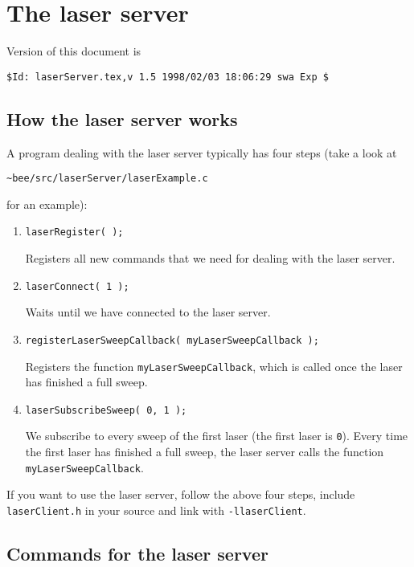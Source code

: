\documentclass{article}
\begin{document}
\section{The laser server}

Version of this document is
\begin{verbatim}
$Id: laserServer.tex,v 1.5 1998/02/03 18:06:29 swa Exp $
\end{verbatim}

\subsection{How the laser server works} 
 
A program dealing with the laser server typically has four steps (take a look at
\begin{center} 
  \texttt{\~{}bee/src/laserServer/laserExample.c}
\end{center}
for an example):

\begin{enumerate}
  
\item \texttt{laserRegister( );} 
  
  Registers all new commands that we need for dealing with the laser server.
  
\item \texttt{laserConnect( 1 );} 
  
  Waits until we have connected to the laser server.
  
\item \texttt{registerLaserSweepCallback( myLaserSweepCallback );} 
  
  Registers the function \texttt{myLaserSweepCallback}, which is called once
  the laser has finished a full sweep.

\item \texttt{laserSubscribeSweep( 0, 1 );}
  
  We subscribe to every sweep of the first laser (the first laser is
  \texttt{0}). Every time the first laser has finished a full sweep, the laser
  server calls the function \texttt{myLaserSweepCallback}.

\end{enumerate}
 
If you want to use the laser server, follow the above four steps, include
\texttt{laserClient.h} in your source and link with \texttt{-llaserClient}.

\subsection{Commands for the laser server}
\end{document}
